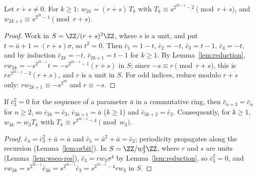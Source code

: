 \begin{lemma}
  \label{lem:strongcong}
  \leanok
  Let $r + s \ne 0$. For $k \ge 1$: $w_{2k} = (r + s)\, T_k$ with
  $T_k \equiv s^{2^{2k-1} - 2} \pmod{r + s}$, and $w_{2k+1} \equiv s^{2^{2k} - 1} \pmod{r + s}$.
\end{lemma}
\begin{proof}
  \leanok
  Work in $S = \ZZ/(r+s)^2\ZZ$, where $s$ is a unit, and put $t = \bar a + 1 = (r + s)\sigma$, so
  $t^2 = 0$. Then $\bar c_1 = 1 - t$, $\bar c_2 = -t$, $\bar c_3 = t - 1$, $\bar c_4 = -t$, and by
  induction $\bar c_{2k} = -t$, $\bar c_{2k+1} = t - 1$ for $k \ge 1$. By
  Lemma~\ref{lem:reduction}, $r w_{2k} = -s^{2^{2k-1}} t = -s^{2^{2k-1} - 1}(r + s)$ in $S$; since
  $-s \equiv r \pmod{r + s}$, this is $r s^{2^{2k-1} - 2}(r + s)$, and $r$ is a unit in $S$. For
  odd indices, reduce modulo $r + s$ only: $r w_{2k+1} \equiv -s^{2^{2k}}$ and $r \equiv -s$.
\end{proof}

\begin{lemma}
  \label{lem:strongcong3}
  \leanok
  If $\bar c_3^2 = 0$ for the sequence of a parameter $\bar a$ in a commutative ring, then
  $\bar c_{n+3} = \bar c_n$ for $n \ge 2$, so $\bar c_{3k} = \bar c_3$, $\bar c_{3k+1} = \bar a$
  ($k \ge 1$) and $\bar c_{3k+2} = \bar c_2$. Consequently, for $k \ge 1$, $w_{3k} = w_3 T_k$ with
  $T_k \equiv s^{2^{3k-1} - 4} \pmod{w_3}$.
\end{lemma}
\begin{proof}
  \leanok
  $\bar c_4 = \bar c_3^2 + \bar a = \bar a$ and $\bar c_5 = \bar a^2 + \bar a = \bar c_2$; periodicity
  propagates along the recursion (Lemma~\ref{lem:orbit}). In $S = \ZZ/w_3^2\ZZ$, where $r$ and $s$
  are units (Lemma~\ref{lem:wseq-res}), $\bar c_3 = r w_3 \sigma^4$ by Lemma~\ref{lem:reduction},
  so $\bar c_3^2 = 0$, and $r w_{3k} = s^{2^{3k-1}} \bar c_{3k} = s^{2^{3k-1}} \bar c_3 =
  s^{2^{3k-1} - 4} r w_3$ in $S$.
\end{proof}

